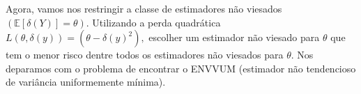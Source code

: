 \documentclass[12pt]{beamer}
\begin{document}

\begin{frame}{}
\begin{block}{}
\justifying
Agora, vamos nos restringir a classe de estimadores não viesados $(\mathbb{E}[\delta(Y)] = \theta).$ Utilizando a perda quadrática $L(\theta, \delta(y))=(\theta-\delta(y)^{2}),$ escolher um estimador não viesado para $\theta$ que tem o menor risco dentre todos os estimadores não viesados para $\theta.$ Nos deparamos com o problema de encontrar o ENVVUM (estimador não tendencioso de variância uniformemente mínima).
\end{block}
\end{frame}
\end{document}
